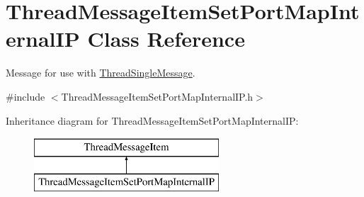 \hypertarget{class_thread_message_item_set_port_map_internal_i_p}{
\section{ThreadMessageItemSetPortMapInternalIP Class Reference}
\label{class_thread_message_item_set_port_map_internal_i_p}
}


Message for use with \hyperlink{class_thread_single_message}{ThreadSingleMessage}.  




{\ttfamily \#include $<$ThreadMessageItemSetPortMapInternalIP.h$>$}

Inheritance diagram for ThreadMessageItemSetPortMapInternalIP:\begin{figure}[H]
\begin{center}
\leavevmode
\includegraphics[height=2.000000cm]{class_thread_message_item_set_port_map_internal_i_p}
\end{center}
\end{figure}
